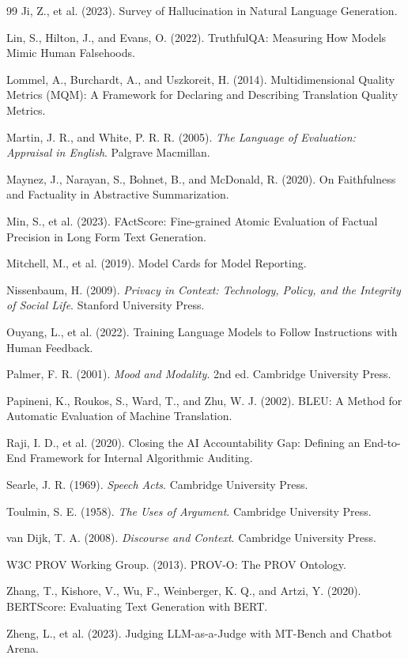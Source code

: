 \documentclass[
  a4paper]{ltjsarticle}
\begin{document}
\begin{thebibliography}{99}
Ji, Z., et al. (2023). Survey of Hallucination in Natural Language Generation.

Lin, S., Hilton, J., and Evans, O. (2022). TruthfulQA: Measuring How Models Mimic Human Falsehoods.

Lommel, A., Burchardt, A., and Uszkoreit, H. (2014). Multidimensional Quality Metrics (MQM): A Framework for Declaring and Describing Translation Quality Metrics.

Martin, J. R., and White, P. R. R. (2005). \textit{The Language of Evaluation: Appraisal in English}. Palgrave Macmillan.

Maynez, J., Narayan, S., Bohnet, B., and McDonald, R. (2020). On Faithfulness and Factuality in Abstractive Summarization.

Min, S., et al. (2023). FActScore: Fine-grained Atomic Evaluation of Factual Precision in Long Form Text Generation.

Mitchell, M., et al. (2019). Model Cards for Model Reporting.

Nissenbaum, H. (2009). \textit{Privacy in Context: Technology, Policy, and the Integrity of Social Life}. Stanford University Press.

Ouyang, L., et al. (2022). Training Language Models to Follow Instructions with Human Feedback.

Palmer, F. R. (2001). \textit{Mood and Modality}. 2nd ed. Cambridge University Press.

Papineni, K., Roukos, S., Ward, T., and Zhu, W. J. (2002). BLEU: A Method for Automatic Evaluation of Machine Translation.

Raji, I. D., et al. (2020). Closing the AI Accountability Gap: Defining an End-to-End Framework for Internal Algorithmic Auditing.

Searle, J. R. (1969). \textit{Speech Acts}. Cambridge University Press.

Toulmin, S. E. (1958). \textit{The Uses of Argument}. Cambridge University Press.

van Dijk, T. A. (2008). \textit{Discourse and Context}. Cambridge University Press.

W3C PROV Working Group. (2013). PROV-O: The PROV Ontology.

Zhang, T., Kishore, V., Wu, F., Weinberger, K. Q., and Artzi, Y. (2020). BERTScore: Evaluating Text Generation with BERT.

Zheng, L., et al. (2023). Judging LLM-as-a-Judge with MT-Bench and Chatbot Arena.

\end{thebibliography}
\end{document}
